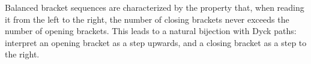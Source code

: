 

\setcounter{section}{4}
\setcounter{subsection}{5}
\setcounter{dfn}{9}

Balanced bracket sequences are characterized by the property that,
when reading it from the left to the right, the number of closing brackets never exceeds the number of opening brackets.
This leads to a natural bijection with Dyck paths: interpret an opening bracket as a step upwards, and a closing bracket as a step to the right.




